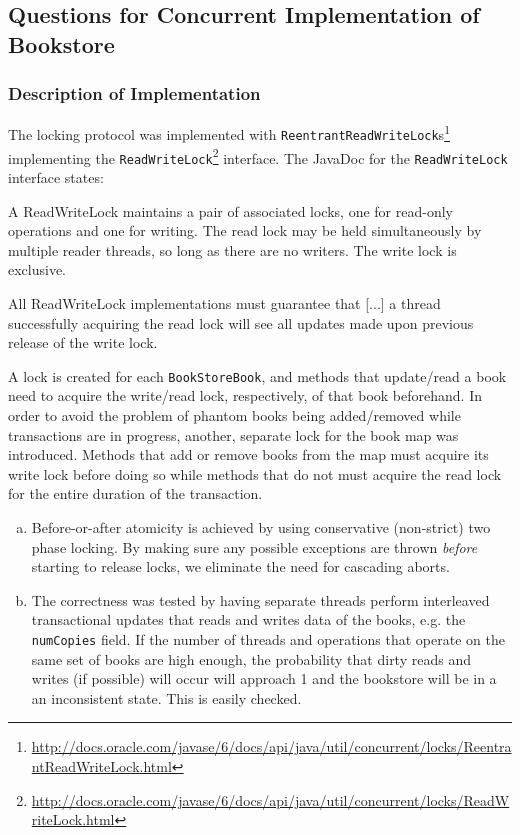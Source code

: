 \documentclass[11pt,a4paper,english]{article}
\begin{document}
\subsection{Questions for Concurrent Implementation of Bookstore}
\subsubsection{Description of Implementation}
The locking protocol was implemented with \texttt{ReentrantReadWriteLock}s\footnote{\url{http://docs.oracle.com/javase/6/docs/api/java/util/concurrent/locks/ReentrantReadWriteLock.html}} implementing the  \texttt{ReadWriteLock}\footnote{\url{http://docs.oracle.com/javase/6/docs/api/java/util/concurrent/locks/ReadWriteLock.html}} interface. The JavaDoc for the \texttt{ReadWriteLock} interface  states:

\begin{displayquote}
A ReadWriteLock maintains a pair of associated locks, one for read-only operations and one for writing. The read lock may be held simultaneously by multiple reader threads, so long as there are no writers. The write lock is exclusive.

All ReadWriteLock implementations must guarantee that [...] a thread successfully acquiring the read lock will see all updates made upon previous release of the write lock.
\end{displayquote}
A lock is created for each \texttt{BookStoreBook}, and methods that update/read a book need to acquire the write/read lock, respectively, of that book beforehand. In order to avoid the problem of phantom books being added/removed while transactions are in progress, another, separate lock for the book map was introduced. Methods that add or remove books from the map must acquire its write lock before doing so while methods that do not must acquire the read lock for the entire duration of the transaction.

\begin{enumerate}[(a)]
\item Before-or-after atomicity is achieved by using conservative (non-strict)
  two phase locking. By making sure any possible exceptions are thrown
  \emph{before} starting to release locks, we eliminate the need for cascading
  aborts.
  
\item The correctness was tested by having separate threads perform interleaved transactional updates that reads and writes data of the books, e.g. the \texttt{numCopies} field. If the number of threads and operations that operate on the same set of books are high enough, the probability that dirty reads and writes (if possible) will occur will approach 1 and the bookstore will be in a an inconsistent state. This is easily checked.
\end{enumerate}
\end{document}
